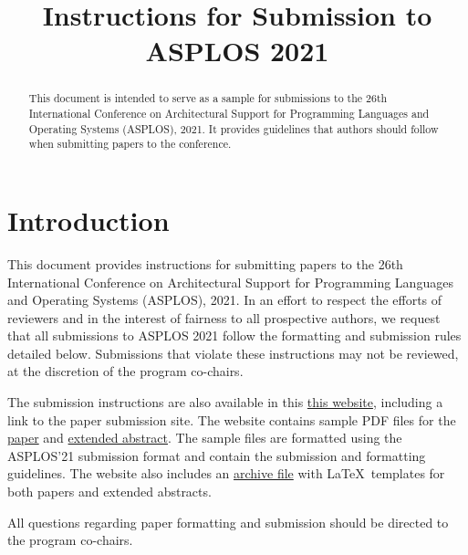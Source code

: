 \documentclass[pageno]{jpaper}
\begin{document}
\title{
Instructions for Submission to ASPLOS 2021}

\date{}
\maketitle

\thispagestyle{empty}

\begin{abstract}

This document is intended to serve as a sample for submissions to the
26th International Conference on Architectural Support for Programming
Languages and Operating Systems (ASPLOS), 2021.  It provides
guidelines that authors should follow when submitting papers to the
conference. 

\end{abstract}

\section{Introduction}

This document provides instructions for submitting papers to the 26th
International Conference on Architectural Support for Programming
Languages and Operating Systems (ASPLOS), 2021.  In an effort to
respect the efforts of reviewers and in the interest of fairness to
all prospective authors, we request that all submissions to ASPLOS
2021 follow the formatting and submission rules detailed below.
Submissions that violate these instructions may not be reviewed, at the
discretion of the program co-chairs.

The submission instructions are also available in this
\href{https://asplos-conference.org/submissions/}{this website},
including a link to the paper submission site. The website contains
sample PDF files for the
\href{https://asplos-conference.org/wp-content/uploads/2020/06/asplos21-paper-template.pdf}{paper} and
\href{https://asplos-conference.org/wp-content/uploads/2020/06/asplos21-extended-abstract-template.pdf}{extended abstract}. The
sample files are formatted using the ASPLOS'21 submission format and
contain the submission and formatting guidelines. The website also
includes an \href{https://asplos-conference.org/wp-content/uploads/2020/06/asplos21-templates.zip}{archive file}
with \LaTeX~templates for both papers and extended abstracts.

All questions regarding paper formatting and submission should be directed
to the program co-chairs.
\end{document}
